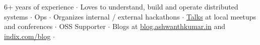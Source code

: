 

\begin{cvparagraph}
6+ years of experience ${\cdotp}$ Loves to understand, build and operate distributed systems ${\cdotp}$ Ops ${\cdotp}$ Organizes internal / external hackathons ${\cdotp}$ \href{https://github.com/ashwanthkumar/talks}{Talks} at local meetups and conferences ${\cdotp}$ OSS Supporter ${\cdotp}$ Blogs at \href{http://blog.ashwanthkumar.in/}{blog.ashwanthkumar.in} and \href{http://www.indix.com/blog/author/ashwanth/}{indix.com/blog} ${\cdotp}$
\end{cvparagraph}
